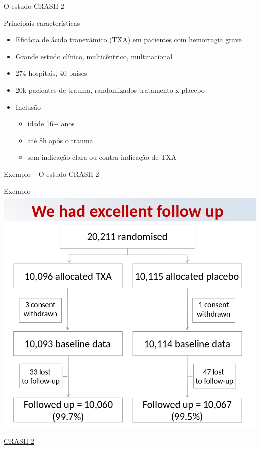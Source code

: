 \documentclass{beamer}
\begin{document}
\begin{frame}{O estudo CRASH-2}
  \begin{exampleblock}{Principais características}
  \begin{itemize}
    \scriptsize
  \item Eficácia de ácido tranexâmico (TXA) em pacientes com hemorragia grave
    \medskip
  \item Grande estudo clínico, multicêntrico, multinacional
    \medskip
  \item 274 hospitais, 40 países
    \medskip
  \item 20k pacientes de trauma, randomizados tratamento x placebo
    \medskip
  \item Inclusão
    \begin{itemize}
      \scriptsize
    \item idade 16+ anos
    \item até 8h após o trauma
    \item sem indicação clara ou contra-indicação de TXA
    \end{itemize}
  \end{itemize}
\end{exampleblock}
\end{frame}

\begin{frame}{Exemplo -- O estudo CRASH-2}
  \begin{exampleblock}{Exemplo}
    \centering
    \includegraphics[height=.75\textheight]{Planejamento/CRASH-flow}
  \end{exampleblock}
  \vfill
  \scriptsize
  \hfill \href{http://www.crash2.lshtm.ac.uk/}{CRASH-2}
\end{frame}
\end{document}
